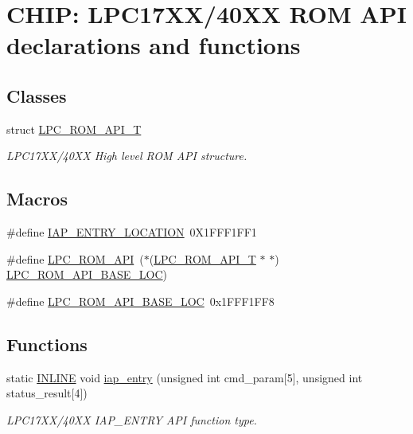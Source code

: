 \hypertarget{group__ROMAPI__407X__8X}{}\section{C\+H\+IP\+: L\+P\+C17\+X\+X/40\+XX R\+OM A\+PI declarations and functions}
\label{group__ROMAPI__407X__8X}
\subsection*{Classes}
\begin{DoxyCompactItemize}
\item 
struct \hyperlink{structLPC__ROM__API__T}{L\+P\+C\+\_\+\+R\+O\+M\+\_\+\+A\+P\+I\+\_\+T}
\begin{DoxyCompactList}\small\item\em L\+P\+C17\+X\+X/40\+XX High level R\+OM A\+PI structure. \end{DoxyCompactList}\end{DoxyCompactItemize}
\subsection*{Macros}
\begin{DoxyCompactItemize}
\item 
\#define \hyperlink{group__ROMAPI__407X__8X_ga3d74da11ceb6b4ccf6d3730825406515}{I\+A\+P\+\_\+\+E\+N\+T\+R\+Y\+\_\+\+L\+O\+C\+A\+T\+I\+ON}~0\+X1\+F\+F\+F1\+F\+F1
\item 
\#define \hyperlink{group__ROMAPI__407X__8X_ga93f07fc38c09c20a7141e175ce599ef7}{L\+P\+C\+\_\+\+R\+O\+M\+\_\+\+A\+PI}~($\ast$(\hyperlink{structLPC__ROM__API__T}{L\+P\+C\+\_\+\+R\+O\+M\+\_\+\+A\+P\+I\+\_\+T} $\ast$ $\ast$) \hyperlink{group__ROMAPI__407X__8X_gafd3ca6cb0ad8c0c0b5be437a8387e51b}{L\+P\+C\+\_\+\+R\+O\+M\+\_\+\+A\+P\+I\+\_\+\+B\+A\+S\+E\+\_\+\+L\+OC})
\item 
\#define \hyperlink{group__ROMAPI__407X__8X_gafd3ca6cb0ad8c0c0b5be437a8387e51b}{L\+P\+C\+\_\+\+R\+O\+M\+\_\+\+A\+P\+I\+\_\+\+B\+A\+S\+E\+\_\+\+L\+OC}~0x1\+F\+F\+F1\+F\+F8
\end{DoxyCompactItemize}
\subsection*{Functions}
\begin{DoxyCompactItemize}
\item 
static \hyperlink{group__LPC__Types__Public__Types_ga2eb6f9e0395b47b8d5e3eeae4fe0c116}{I\+N\+L\+I\+NE} void \hyperlink{group__ROMAPI__407X__8X_ga6e16dcc17bc9aaaf82f62d1816d08c4f}{iap\+\_\+entry} (unsigned int cmd\+\_\+param\mbox{[}5\mbox{]}, unsigned int status\+\_\+result\mbox{[}4\mbox{]})
\begin{DoxyCompactList}\small\item\em L\+P\+C17\+X\+X/40\+XX I\+A\+P\+\_\+\+E\+N\+T\+RY A\+PI function type. \end{DoxyCompactList}\end{DoxyCompactItemize}


